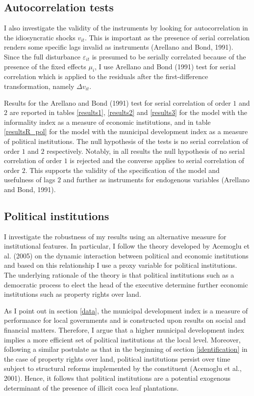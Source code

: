 \documentclass[a4paper, 12pt]{article}
\begin{document}
\subsection{Autocorrelation tests}
\label{auto}

I also investigate the validity of the instruments by looking for  autocorrelation in the idiosyncratic shocks $v_{it}$. This is important as the presence of serial correlation renders some specific lags invalid as instruments (Arellano and Bond, 1991). Since the full disturbance $\varepsilon_{it}$ is presumed to be serially correlated because of the presence of the fixed effects $\mu_{i}$, I use Arellano and Bond (1991) test for serial correlation which is applied to the residuals after the first-difference transformation, namely $\Delta v_{it}$.

Results for the Arellano and Bond (1991) test for serial correlation of order $1$ and $2$ are reported in tables \ref{results1}, \ref{results2} and \ref{results3} for the model with the informality index as a measure of economic institutions, and in table \ref{resultsR_pol} for the model with the municipal development index as a measure of political institutions. The null hypothesis of the tests is no serial correlation of order $1$ and $2$ respectively. Notably, in all results the null hypothesis of no serial correlation of order $1$ is rejected and the converse applies to serial correlation of order $2$. This supports the validity of the specification of the model and usefulness of lags $2$ and further as instruments for endogenous variables (Arellano and Bond, 1991).

\subsection{Political institutions}

I investigate the robustness of my results using an alternative measure for institutional features. In particular, I follow the theory developed by Acemoglu et al. (2005) on the dynamic interaction between political and economic institutions and based on this relationship I use a proxy variable for political institutions. The underlying rationale of the theory is that political institutions such as a democratic process to elect the head of the executive determine further economic institutions such as property rights over land.

As I point out in section \ref{data}, the municipal development index is a measure of performance for local governments and is constructed upon results on social and financial matters. Therefore, I argue that a higher municipal development index implies a more efficient set of political institutions at the local level. Moreover, following a similar postulate as that in the beginning of section \ref{identification} in the case of property rights over land, political institutions persist over time subject to structural reforms implemented by the constituent (Acemoglu et al., 2001). Hence, it follows that political institutions are a potential exogenous determinant of the presence of illicit coca leaf plantations.
\end{document}
